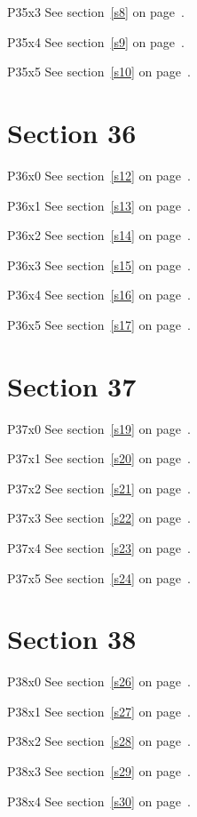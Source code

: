 P35x3 \w\w\w\w\w\w See section~\ref{s8} on page~\pageref{s28}.

P35x4 \w\w\w\w\w\w See section~\ref{s9} on page~\pageref{s29}.

P35x5 \w\w\w\w\w\w See section~\ref{s10} on page~\pageref{s30}.

\section{Section 36}\label{s36}
P36x0 \w\w\w\w\w\w See section~\ref{s12} on page~\pageref{s28}.

P36x1 \w\w\w\w\w\w See section~\ref{s13} on page~\pageref{s29}.

P36x2 \w\w\w\w\w\w See section~\ref{s14} on page~\pageref{s30}.

P36x3 \w\w\w\w\w\w See section~\ref{s15} on page~\pageref{s31}.

P36x4 \w\w\w\w\w\w See section~\ref{s16} on page~\pageref{s32}.

P36x5 \w\w\w\w\w\w See section~\ref{s17} on page~\pageref{s33}.

\section{Section 37}\label{s37}
P37x0 \w\w\w\w\w\w See section~\ref{s19} on page~\pageref{s31}.

P37x1 \w\w\w\w\w\w See section~\ref{s20} on page~\pageref{s32}.

P37x2 \w\w\w\w\w\w See section~\ref{s21} on page~\pageref{s33}.

P37x3 \w\w\w\w\w\w See section~\ref{s22} on page~\pageref{s34}.

P37x4 \w\w\w\w\w\w See section~\ref{s23} on page~\pageref{s35}.

P37x5 \w\w\w\w\w\w See section~\ref{s24} on page~\pageref{s36}.

\section{Section 38}\label{s38}
P38x0 \w\w\w\w\w\w See section~\ref{s26} on page~\pageref{s34}.

P38x1 \w\w\w\w\w\w See section~\ref{s27} on page~\pageref{s35}.

P38x2 \w\w\w\w\w\w See section~\ref{s28} on page~\pageref{s36}.

P38x3 \w\w\w\w\w\w See section~\ref{s29} on page~\pageref{s37}.

P38x4 \w\w\w\w\w\w See section~\ref{s30} on page~\pageref{s38}.

